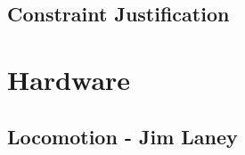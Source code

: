 \documentclass[11pt]{article}		%
\begin{document}
	\subsection[Constraint Justification]{Constraint Justification}
		
	
	\section{Hardware}
	
		\subsection[Locomotion]{Locomotion - Jim Laney}
			
\end{document}
